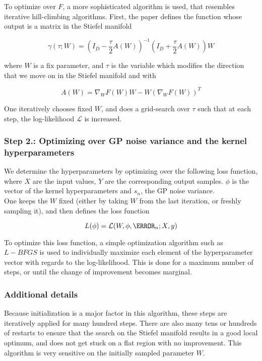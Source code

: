 To optimize over $F$, a more sophisticated algorithm is used, that resembles iterative hill-climbing algorithms.
First, the paper defines the function whose output is a matrix in the Stiefel manifold

\begin{equation}
\gamma(\tau; W) = (I_D - \frac{\tau}{2} A(W) )^{-1} (I_D + \frac{\tau}{2} A(W) ) W
\end{equation}


where $W$ is a fix parameter, and $\tau$ is the variable which modifies the direction that we move on in the Stiefel manifold and with

\begin{equation}
A(W) = \nabla_{W} F(W) W - W ( \nabla_{W} F(W) )^T
\end{equation}

One iteratively chooses fixed $W$, and does a grid-search over $\tau$ such that at each step, the log-likelihood $\mathcal{L}$ is increased.

\subsubsection{Step 2.: Optimizing over GP noise variance and the kernel hyperparameters}

We determine the hyperparameters by optimizing over the following loss function, where $X$ are the input values, $Y$ are the corresponding output samples. $\phi$ is the vector of the kernel hyperparameters and $s_n$, the GP noise variance. \\

One keeps the $W$ fixed (either by taking $W$ from the last iteration, or freshly sampling it), and then defines the loss function

\begin{equation}
	L(\phi) = \mathcal{L}(W, \phi, \s_n; X, y) 
\end{equation}

To optimize this loss function, a simple optimization algorithm such as $L-BFGS$ is used to individually maximize each element of the hyperparameter vector with regards to the log-likelihood.
This is done for a maximum number of steps, or until the change of improvement becomes marginal. \\

\subsubsection{Additional details}
Because initialization is a major factor in this algorithm, these steps are iteratively applied for many hundred steps.
There are also many tens or hundreds of restarts to ensure that the search on the Stiefel manifold results in a good local optimum, and does not get stuck on a flat region with no improvement.
This algorithm is very sensitive on the initially sampled parameter $W$.

